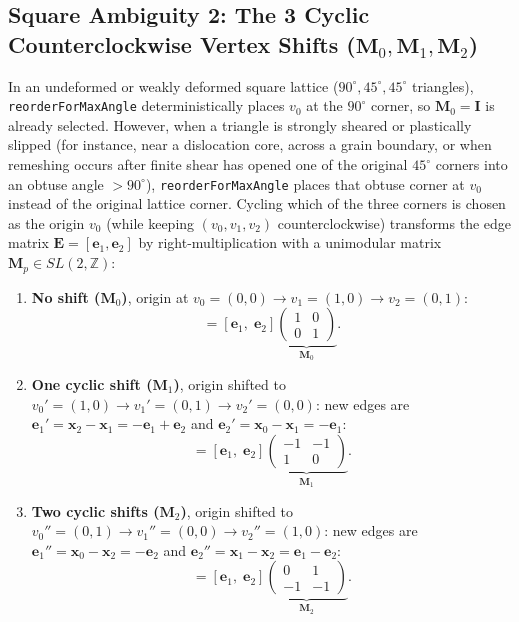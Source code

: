 \documentclass[11pt,a4paper]{article}
\newcommand{\Z}{\mathbb{Z}}
\newcommand{\code}[1]{\texttt{#1}}
\begin{document}
\subsection{Square Ambiguity 2: The 3 Cyclic Counterclockwise Vertex Shifts ($\mathbf{M}_0, \mathbf{M}_1, \mathbf{M}_2$)}
In an undeformed or weakly deformed square lattice ($90^\circ, 45^\circ, 45^\circ$ triangles), \code{reorderForMaxAngle} deterministically places $v_0$ at the $90^\circ$ corner, so $\mathbf{M}_0 = \mathbf{I}$ is already selected. However, when a triangle is strongly sheared or plastically slipped (for instance, near a dislocation core, across a grain boundary, or when remeshing occurs after finite shear has opened one of the original $45^\circ$ corners into an obtuse angle $> 90^\circ$), \code{reorderForMaxAngle} places that obtuse corner at $v_0$ instead of the original lattice corner. Cycling which of the three corners is chosen as the origin $v_0$ (while keeping $(v_0, v_1, v_2)$ counterclockwise) transforms the edge matrix $\mathbf{E} = [\mathbf{e}_1, \mathbf{e}_2]$ by right-multiplication with a unimodular matrix $\mathbf{M}_p \in SL(2,\Z)$:
\begin{enumerate}[noitemsep]
  \item \textbf{No shift ($\mathbf{M}_0$)}, origin at $v_0=(0,0) \to v_1=(1,0) \to v_2=(0,1)$:
  \begin{equation}
    [\mathbf{e}_1,\; \mathbf{e}_2]
    = [\mathbf{e}_1,\; \mathbf{e}_2]
    \underbrace{\begin{pmatrix} 1 & 0 \\ 0 & 1 \end{pmatrix}}_{\mathbf{M}_0}.
  \end{equation}
  \item \textbf{One cyclic shift ($\mathbf{M}_1$)}, origin shifted to $v_0'=(1,0) \to v_1'=(0,1) \to v_2'=(0,0)$:
  new edges are $\mathbf{e}_1' = \mathbf{x}_2 - \mathbf{x}_1 = -\mathbf{e}_1 + \mathbf{e}_2$ and $\mathbf{e}_2' = \mathbf{x}_0 - \mathbf{x}_1 = -\mathbf{e}_1$:
  \begin{equation}
    [\mathbf{e}_1',\; \mathbf{e}_2']
    = [\mathbf{e}_1,\; \mathbf{e}_2]
    \underbrace{\begin{pmatrix} -1 & -1 \\ 1 & 0 \end{pmatrix}}_{\mathbf{M}_1}.
  \end{equation}
  \item \textbf{Two cyclic shifts ($\mathbf{M}_2$)}, origin shifted to $v_0''=(0,1) \to v_1''=(0,0) \to v_2''=(1,0)$:
  new edges are $\mathbf{e}_1'' = \mathbf{x}_0 - \mathbf{x}_2 = -\mathbf{e}_2$ and $\mathbf{e}_2'' = \mathbf{x}_1 - \mathbf{x}_2 = \mathbf{e}_1 - \mathbf{e}_2$:
  \begin{equation}
    [\mathbf{e}_1'',\; \mathbf{e}_2'']
    = [\mathbf{e}_1,\; \mathbf{e}_2]
    \underbrace{\begin{pmatrix} 0 & 1 \\ -1 & -1 \end{pmatrix}}_{\mathbf{M}_2}.
  \end{equation}
\end{enumerate}
\end{document}
